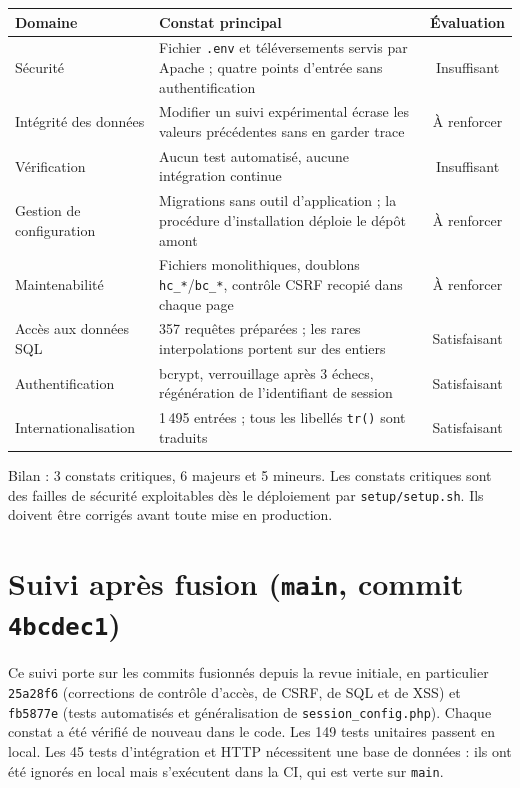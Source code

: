 \documentclass[11pt,a4paper]{article}
\newcommand{\f}[1]{\nolinkurl{#1}}
\begin{document}
\begin{center}
\begin{tabularx}{\textwidth}{@{}lXc@{}}
\toprule
\textbf{Domaine} & \textbf{Constat principal} & \textbf{Évaluation}\\
\midrule
Sécurité & Fichier \f{.env} et téléversements servis par Apache ; quatre points d'entrée sans authentification & \textcolor{crit}{Insuffisant}\\
Intégrité des données & Modifier un suivi expérimental écrase les valeurs précédentes sans en garder trace & \textcolor{maj}{À renforcer}\\
Vérification & Aucun test automatisé, aucune intégration continue & \textcolor{crit}{Insuffisant}\\
Gestion de configuration & Migrations sans outil d'application ; la procédure d'installation déploie le dépôt amont & \textcolor{maj}{À renforcer}\\
Maintenabilité & Fichiers monolithiques, doublons \f{hc_*}/\f{bc_*}, contrôle CSRF recopié dans chaque page & \textcolor{maj}{À renforcer}\\
Accès aux données SQL & 357 requêtes préparées ; les rares interpolations portent sur des entiers & \textcolor{ok}{Satisfaisant}\\
Authentification & bcrypt, verrouillage après 3 échecs, régénération de l'identifiant de session & \textcolor{ok}{Satisfaisant}\\
Internationalisation & 1\,495 entrées ; tous les libellés \f{tr()} sont traduits & \textcolor{ok}{Satisfaisant}\\
\bottomrule
\end{tabularx}
\end{center}

\noindent Bilan : 3 constats critiques, 6 majeurs et 5 mineurs. Les constats
critiques sont des failles de sécurité exploitables dès le déploiement par
\f{setup/setup.sh}. Ils doivent être corrigés avant toute mise en production.

\section{\texorpdfstring{Suivi après fusion (\f{main}, commit \f{4bcdec1})}{Suivi après fusion (main, commit 4bcdec1)}}

Ce suivi porte sur les commits fusionnés depuis la revue initiale, en
particulier \f{25a28f6} (corrections de contrôle d'accès, de CSRF, de SQL et de
XSS) et \f{fb5877e} (tests automatisés et généralisation de
\f{session_config.php}). Chaque constat a été vérifié de nouveau dans le code.
Les 149 tests unitaires passent en local. Les 45 tests d'intégration et HTTP
nécessitent une base de données : ils ont été ignorés en local mais s'exécutent
dans la CI, qui est verte sur \f{main}.
\end{document}
